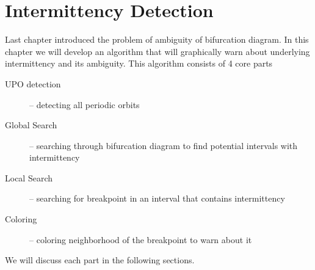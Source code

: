 \chapter{Intermittency Detection}
Last chapter introduced the problem of ambiguity of bifurcation diagram.
In this chapter we will develop an algorithm that will graphically warn about underlying intermittency and its ambiguity.
This algorithm consists of 4 core parts

\begin{description}
    \item [UPO detection] -- detecting all periodic orbits
	\item [Global Search] -- searching through bifurcation diagram to find potential intervals with intermittency
	\item [Local Search] -- searching for breakpoint in an interval that contains intermittency
	\item [Coloring] -- coloring neighborhood of the breakpoint to warn about it
\end{description}

We will discuss each part in the following sections.

